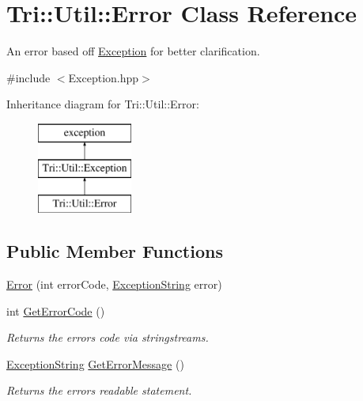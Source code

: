 \hypertarget{class_tri_1_1_util_1_1_error}{}\section{Tri\+:\+:Util\+:\+:Error Class Reference}
\label{class_tri_1_1_util_1_1_error}


An error based off \hyperlink{class_tri_1_1_util_1_1_exception}{Exception} for better clarification.  




{\ttfamily \#include $<$Exception.\+hpp$>$}

Inheritance diagram for Tri\+:\+:Util\+:\+:Error\+:\begin{figure}[H]
\begin{center}
\leavevmode
\includegraphics[height=3.000000cm]{class_tri_1_1_util_1_1_error}
\end{center}
\end{figure}
\subsection*{Public Member Functions}
\begin{DoxyCompactItemize}
\item 
\hyperlink{class_tri_1_1_util_1_1_error_ab293edeabb80453cbf88830fe983638c}{Error} (int error\+Code, \hyperlink{namespace_tri_1_1_util_ac7d0a48237beb68f23ba39a6ad03b4bc}{Exception\+String} error)
\item 
int \hyperlink{class_tri_1_1_util_1_1_error_a58cfa564fedcada30f3df740e3e6051d}{Get\+Error\+Code} ()
\begin{DoxyCompactList}\small\item\em Returns the error\textquotesingle{}s code via stringstreams. \end{DoxyCompactList}\item 
\hyperlink{namespace_tri_1_1_util_ac7d0a48237beb68f23ba39a6ad03b4bc}{Exception\+String} \hyperlink{class_tri_1_1_util_1_1_error_a555f6b8ac961c9afc22917967e1ada18}{Get\+Error\+Message} ()
\begin{DoxyCompactList}\small\item\em Returns the error\textquotesingle{}s readable statement. \end{DoxyCompactList}\end{DoxyCompactItemize}
